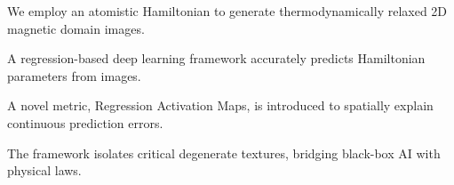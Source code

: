 \documentclass[preprint,12pt]{elsarticle}
\begin{document}
\newcommand{\Real}{\mathbb{R}}
\newcommand{\N}{\mathbb{N}}
\newcommand{\Z}{\mathbb{Z}}
\newcommand{\X}{\mathcal{X}}
\newcommand{\Y}{\mathcal{Y}}
\newcommand{\boldV}{\mathbf{V}}
\newcommand{\dataset}{{\cal D}}
\newcommand{\gauss}{\mathcal{N}} 

\providecommand{\ch}[1]{\textcolor{blue!50}{#1}}

\let\WriteBookmarks\relax
\def\floatpagepagefraction{1}
\def\textpagefraction{.001}


\begin{frontmatter}

\begin{highlights}
\item We employ an atomistic Hamiltonian to generate thermodynamically relaxed 2D magnetic domain images.
\item A regression-based deep learning framework accurately predicts Hamiltonian parameters from images.
\item A novel metric, Regression Activation Maps, is introduced to spatially explain continuous prediction errors.
\item The framework isolates critical degenerate textures, bridging black-box AI with physical laws.
\end{highlights}

\end{frontmatter}
\end{document}
